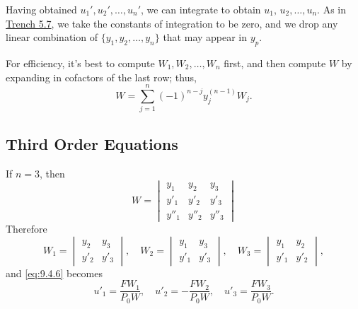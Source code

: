 \documentclass{ximera}
\begin{document}
Having obtained $u_1', u_2', \dots, u_n'$, we can integrate  to
obtain $u_1,\,u_2,\dots,u_n$. As in \href{https://ximera.osu.edu/ode/main/variationOfParameters/variationOfParameters}{Trench 5.7}, we
take the constants
of integration to be zero, and we drop any linear combination of
$\{y_1,y_2,\dots,y_n\}$ that may appear in $y_p$.


\begin{remark}
For efficiency, it's best to compute $W_1, W_2, \dots, W_n$
first, and then compute $W$ by expanding in cofactors of the last row;
thus,
$$
W=\sum_{j=1}^n(-1)^{n-j}y_j^{(n-1)}W_j.
$$
\end{remark}



\subsection*{Third Order Equations}

If $n=3$, then
$$
W=\begin{vmatrix}
y_1&y_2&y_3 \\
y'_1&y'_2&y'_3 \\
y''_1&y''_2&y''_3 \end{vmatrix}
$$
Therefore
$$
W_1=\begin{vmatrix}
y_2&y_3 \\
y'_2&y'_3 \end{vmatrix},
\quad W_2=\begin{vmatrix}
y_1&y_3 \\
 y'_1&y'_3 \end{vmatrix},
\quad W_3=\begin{vmatrix}
y_1&y_2 \\
y'_1&y'_2 \end{vmatrix},
$$
and  \eqref{eq:9.4.6}  becomes
\begin{equation} \label{eq:9.4.7}
u'_1=\frac{FW_1}{P_0W},\quad u'_2=-\frac{FW_2}{P_0W},\quad
u'_3=\frac{FW_3}{P_0W}.
\end{equation}
\end{document}
